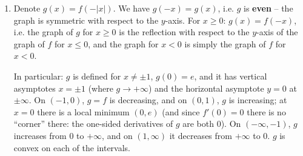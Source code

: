 \begin{solution}
\begin{enumerate}
  \textbf{Sketch (described in words):} on the left the graph starts just above the asymptote $y=0$ (close to $0$ at $-\infty$), increases in a convex manner and tends to $+\infty$ as $x\to-1^-$. To the right of the asymptote $x=-1$ the graph decreases from $+\infty$ to the minimum $(0,e)$ and then increases rapidly (exponentially) to $+\infty$. The whole graph lies above the $x$-axis.

  \item Denote $g(x)=f(-|x|)$. We have $g(-x)=g(x)$, i.e. $g$ is \textbf{even} -- the graph is symmetric with respect to the $y$-axis. For $x\ge0$: $g(x)=f(-x)$, i.e. the graph of $g$ for $x\ge0$ is the reflection with respect to the $y$-axis of the graph of $f$ for $x\le 0$, and the graph for $x<0$ is simply the graph of $f$ for $x<0$.

  In particular: $g$ is defined for $x\neq\pm1$, $g(0)=e$, and it has vertical asymptotes $x=\pm1$ (where $g\to+\infty$) and the horizontal asymptote $y=0$ at $\pm\infty$. On $(-1,0)$, $g=f$ is decreasing, and on $(0,1)$, $g$ is increasing; at $x=0$ there is a local minimum $(0,e)$ (and since $f'(0)=0$ there is no ``corner'' there: the one-sided derivatives of $g$ are both $0$). On $(-\infty,-1)$, $g$ increases from $0$ to $+\infty$, and on $(1,\infty)$ it decreases from $+\infty$ to $0$. $g$ is convex on each of the intervals.
\end{enumerate}
\end{solution}
